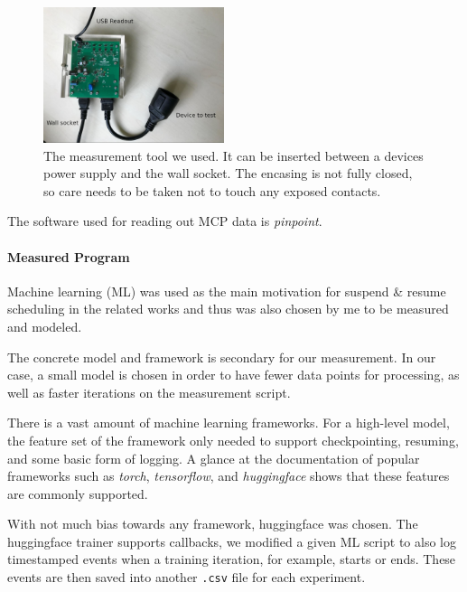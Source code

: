 \begin{figure}
    \centering
    \includegraphics[width=200px]{images/mcp_graphic_design_is_my_passion.jpg}
    \caption[short]{The measurement tool we used. It can be inserted between a devices power supply and the wall socket. The encasing is not fully closed, so care needs to be taken not to touch any exposed contacts.}
    \label{fig:mcp}
\end{figure}


The software used for reading out MCP data is \emph{pinpoint}\cite{kohler_pinpoint_2020}.

\paragraph{Measured Program}

Machine learning (ML) was used as the main motivation for suspend \& resume scheduling in the related works\cite {wiesner_lets_2021} and thus was also chosen by me to be measured and modeled. 

The concrete model and framework is secondary for our measurement. In our case, a small model is chosen in order to have fewer data points for processing, as well as faster iterations on the measurement script. 

There is a vast amount of machine learning frameworks. 
For a high-level model, the feature set of the framework only needed to support checkpointing, resuming, and some basic form of logging. 
A glance at the documentation of popular frameworks such as \emph{torch}, \emph{tensorflow}, and \emph{huggingface} shows that these features are commonly supported. 

With not much bias towards any framework, huggingface was chosen.
The huggingface trainer supports callbacks, we modified a given ML script to also log timestamped events when a training iteration, for example, starts or ends. 
These events are then saved into another \verb|.csv| file for each experiment.

